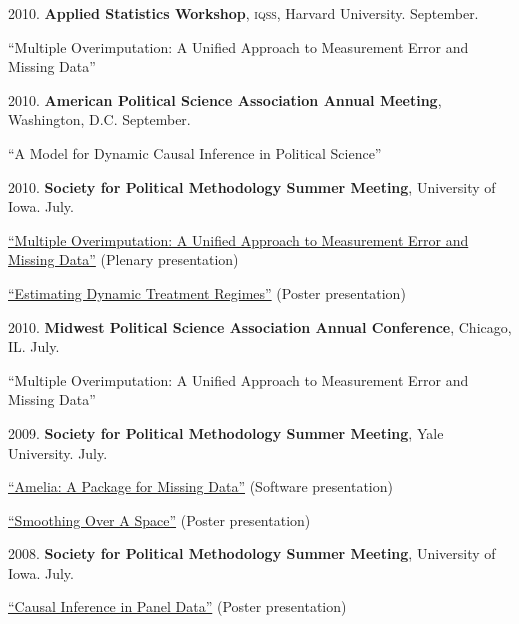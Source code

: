 \documentclass[margin,line]{res}
\newenvironment{list1}{
  \begin{list}{\ding{113}}{%
      \setlength{\itemsep}{0in}
      \setlength{\parsep}{0in} \setlength{\parskip}{0in}
      \setlength{\topsep}{0in} \setlength{\partopsep}{0in} 
      \setlength{\leftmargin}{0.83 cm}}}{\end{list}}
\begin{document}
\begin{resume}
2010. {\bf Applied Statistics Workshop}, \textsc{iqss}, Harvard University. September.
\begin{list1}
\item[] “Multiple Overimputation: A Unified Approach to Measurement Error and
Missing Data”
\end{list1}\vspace{-0em}

2010. {\bf American Political Science Association Annual Meeting}, Washington, D.C. September. 
\begin{list1} 
\item[] “A Model for Dynamic Causal Inference in Political
    Science”
\end{list1}\vspace{-0em}
2010. {\bf Society for Political Methodology  Summer Meeting}, University of Iowa. July.
\begin{list1}
\item[] \href{http://mattblackwell.org/files/papers/merror-methods.pdf}{“Multiple Overimputation: A Unified Approach to Measurement Error and
Missing Data”} (Plenary presentation)
\item[] \href{http://mattblackwell.org/files/papers/panel-poster.pdf}{“Estimating Dynamic Treatment Regimes”} (Poster presentation)
\end{list1}\vspace{-0em}

2010. {\bf Midwest Political Science Association Annual Conference}, Chicago, IL. July. 
\begin{list1}
\item[] “Multiple Overimputation: A Unified Approach to Measurement Error and
Missing Data”
\end{list1}\vspace{-0em}

2009. {\bf Society for Political Methodology  Summer Meeting}, Yale University. July.
\begin{list1}
\item[]  \href{http://mattblackwell.org/files/papers/amelia-polmeth.pdf}{“Amelia: A Package for Missing Data”} (Software presentation)
\item[]  \href{http://mattblackwell.org/files/papers/polls-poster.pdf}{“Smoothing Over A Space”} (Poster presentation)
\end{list1}\vspace{-0em}

2008. {\bf Society for Political Methodology  Summer Meeting}, University of Iowa. July.
\begin{list1}
\item[] \href{http://mattblackwell.org/files/papers/tsposter.pdf}{“Causal Inference in Panel Data”} (Poster presentation)
\end{list1}\vspace{-.5em}


\end{resume}
\end{document}
